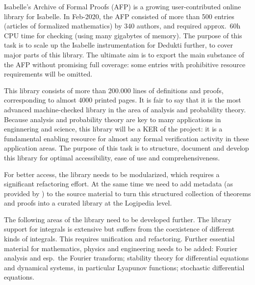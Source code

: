 \begin{workpackage}[id=libraries,wphases=0-48,type=RTD,
  short=Libraries,%
  title=Libraries,
  lead=Tum,
  ChaRM=12,
  StrRM=18,
  TumRM=27]
\begin{tasklist}


\begin{task}[id=afp,title=Isabelle's Archive of Formal Proofs,lead=Tum,TumRM=3]
Isabelle's Archive of Formal Proofs (AFP) \cite{isabelle-afp} is a
growing user-contributed online library for Isabelle. In Feb-2020, the
AFP consisted of more than 500 entries (articles of formalized
mathematics) by 340 authors, and required approx.\ 60h CPU time for
checking (using many gigabytes of memory).  The purpose of this task
is to scale up the Isabelle instrumentation for Dedukti further, to
cover major parts of this library. The ultimate aim is to export the main
substance of the AFP without promising full coverage: some entries
with prohibitive resource requirements will be omitted.
\end{task}

\begin{task}[id=isaAnalysisProb,
  title=The Isabelle Analysis \& Probability Theory library,
  lead=Tum,TumRM=24]
This library consists of more than
200.000 lines of definitions and proofs, corresponding to almost 4000 printed
pages. It is fair to say that it is the most
advanced machine-checked library in the area of analysis and probability
theory. Because analysis and probability theory are key to many applications
in enginnering and science, this library will be a
KER of the project: it is a fundamental enabling resource for almost any
formal verification activity in these application areas. The purpose of this task is to structure, document
and develop this library for optimal accessibility, ease of use and
comprehensiveness.

For better access, the library needs to be modularized, which requires
a significant refactoring effort.  At the same time we need to add
metadata (as provided by ) to the source material
to turn this structured collection of theorems and proofs into a
curated library at the Logipedia level.

The following areas of the library need to be developed further. The
library support for integrals is extensive but suffers from the
coexistence of different kinds of integrals. This requires unification
and refactoring. Further essential material for mathematics, physics
and engineering needs to be added: Fourier
analysis and esp.\ the Fourier transform; stability theory for
differential equations and dynamical systems, in particular Lyapunov
functions; stochastic differential equations.
\end{task}


\end{tasklist}
\end{workpackage}
